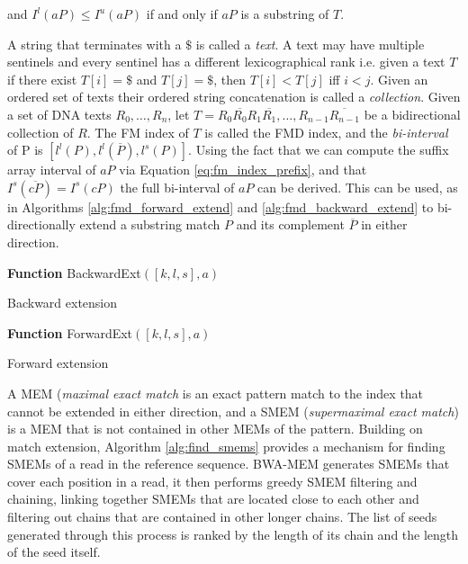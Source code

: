 and $I^l(aP)\le I^u(aP)$ if and only if $aP$ is a substring of $T$.

A string that terminates with a $\$$ is called a \emph{text}. A text may have multiple sentinels and every sentinel has a different lexicographical rank i.e. given a text $T$ if there exist $T[i]=\$$ and $T[j]=\$$, then $T[i] < T[j]$ iff $i<j$. Given an ordered set of texts their ordered string concatenation is called a \emph{collection}. Given a set of DNA texts $R_0,\dots,R_n$, let $T=R_0\overline{R_0}R_1\overline{R_1},\dots,R_{n-1}\overline{R_{n-1}}$ be a {bidirectional collection} of $R$. The FM index of $T$ is called the FMD index, and the \emph{bi-interval} of P is $[l^l(P),l^l(\overline{P}), l^s(P)]$. Using the fact that we can compute the suffix array interval of $aP$ via Equation \ref{eq:fm_index_prefix}, and that $I^s(\overline{cP})=I^s(cP)$ the full bi-interval of $aP$ can be derived. This can be used, as in Algorithms \ref{alg:fmd_forward_extend} and \ref{alg:fmd_backward_extend} to bi-directionally extend a substring match $P$ and its complement $\overline{P}$ in either direction.

\begin{algorithm2e}[h]
\DontPrintSemicolon
\footnotesize
{}
\BlankLine
\textbf{Function} {\sc BackwardExt}$([k,l,s],a)$
\caption{Backward extension\autocite{li2012exploring}}
\label{alg:fmd_backward_extend}
\end{algorithm2e}

\begin{algorithm2e}[h]
\DontPrintSemicolon
\footnotesize
{}
\BlankLine
\textbf{Function} {\sc ForwardExt}$([k,l,s],a)$
\caption{Forward extension\autocite{li2012exploring}}
\label{alg:fmd_forward_extend}
\end{algorithm2e}

A MEM (\emph{maximal exact match} is an exact pattern match to the index that cannot be extended in either direction, and a SMEM (\emph{supermaximal exact match}) is a MEM that is not contained in other MEMs of the pattern. Building on match extension, Algorithm \ref{alg:find_smems}\autocite{li2012exploring} provides a mechanism for finding SMEMs of a read in the reference sequence. BWA-MEM generates SMEMs that cover each position in a read, it then performs greedy SMEM filtering and chaining, linking together SMEMs that are located close to each other and filtering out chains that are contained in other longer chains. The list of seeds generated through this process is ranked by the length of its chain and the length of the seed itself. 

